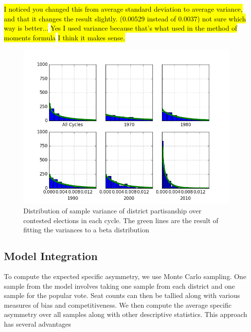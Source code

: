 \documentclass[preprint,12pt]{article}
\newcommand{\CM}[2][green]{ {\sethlcolor{#1} \hl{#2}} }
\newcommand{\KB}[2][cyan]{ {\sethlcolor{#1} \hl{#2}} }
\begin{document}
\KB{I noticed you changed this from average standard deviation to average variance, and that it changes the result slightly. (0.00529 instead of 0.0037)  not sure which way is better...}\CM{Yes I used variance because that's what used in the method of moments formula}\KB{I think it makes sense.}
\begin{figure}[htb!]
    \begin{center}
        \includegraphics[scale=0.8]{../Figures/HistoricAsymmetry/VarHist.png}
        \caption{Distribution of sample variance of district partisanship over contested elections in each cycle. The green lines are the result of fitting the variances to a beta distribution}\label{fig:varHist}
    \end{center}
\end{figure}
\subsection{Model Integration}
To compute the expected specific asymmetry, we use Monte Carlo sampling.
One sample from the model involves taking one sample from each district and one sample for the popular vote.
Seat counts can then be tallied along with various measures of bias and competitiveness.
We then compute the average specific asymmetry over all samples along with other descriptive statistics.
This approach has several advantages
\end{document}
